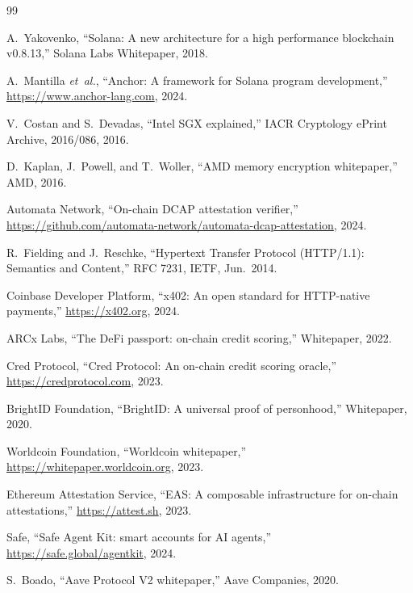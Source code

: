 \documentclass[10pt,conference,letterpaper]{IEEEtran}
\theoremstyle{definition}
\begin{document}
\begin{thebibliography}{99}

A.~Yakovenko,
``{Solana}: A new architecture for a high performance blockchain v0.8.13,''
Solana Labs Whitepaper, 2018.

A.~Mantilla \emph{et~al.},
``Anchor: A framework for Solana program development,''
\url{https://www.anchor-lang.com}, 2024.

V.~Costan and S.~Devadas,
``Intel SGX explained,''
IACR Cryptology ePrint Archive, 2016/086, 2016.

D.~Kaplan, J.~Powell, and T.~Woller,
``AMD memory encryption whitepaper,''
AMD, 2016.

Automata Network,
``On-chain DCAP attestation verifier,''
\url{https://github.com/automata-network/automata-dcap-attestation},
2024.

R.~Fielding and J.~Reschke,
``Hypertext Transfer Protocol (HTTP/1.1): Semantics and Content,''
RFC 7231, IETF, Jun.~2014.

Coinbase Developer Platform,
``x402: An open standard for HTTP-native payments,''
\url{https://x402.org}, 2024.

ARCx Labs,
``The DeFi passport: on-chain credit scoring,''
Whitepaper, 2022.

Cred Protocol,
``Cred Protocol: An on-chain credit scoring oracle,''
\url{https://credprotocol.com}, 2023.

BrightID Foundation,
``BrightID: A universal proof of personhood,''
Whitepaper, 2020.

Worldcoin Foundation,
``Worldcoin whitepaper,''
\url{https://whitepaper.worldcoin.org}, 2023.

Ethereum Attestation Service,
``EAS: A composable infrastructure for on-chain attestations,''
\url{https://attest.sh}, 2023.

Safe,
``Safe Agent Kit: smart accounts for AI agents,''
\url{https://safe.global/agentkit}, 2024.

S.~Boado,
``Aave Protocol V2 whitepaper,''
Aave Companies, 2020.


\end{thebibliography}
\end{document}
